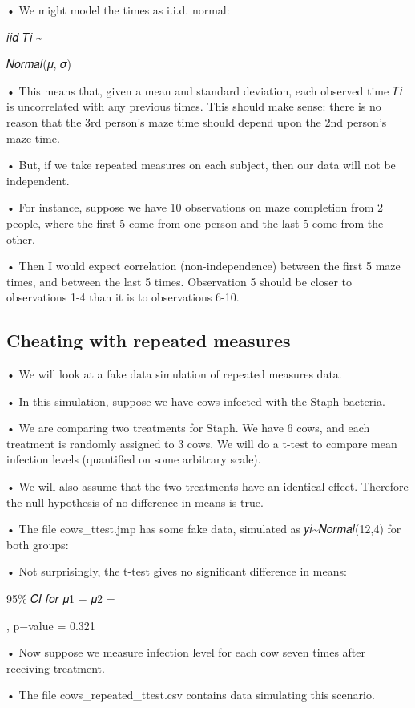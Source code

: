 \documentclass[
  letterpaper,
  DIV=11,
  numbers=noendperiod]{scrreprt}
\begin{document}
• We might model the times as i.i.d. normal:

𝑖𝑖𝑑 𝑇𝑖 \textasciitilde{}

𝑁𝑜𝑟𝑚𝑎𝑙(𝜇, 𝜎)

• This means that, given a mean and standard deviation, each observed
time 𝑇𝑖 is uncorrelated with any previous times. This should make sense:
there is no reason that the 3rd person's maze time should depend upon
the 2nd person's maze time.

• But, if we take repeated measures on each subject, then our data will
not be independent.

• For instance, suppose we have 10 observations on maze completion from
2 people, where the first 5 come from one person and the last 5 come
from the other.

• Then I would expect correlation (non-independence) between the first 5
maze times, and between the last 5 times. Observation 5 should be closer
to observations 1-4 than it is to observations 6-10.

\hypertarget{cheating-with-repeated-measures}{%
\subsection{Cheating with repeated
measures}\label{cheating-with-repeated-measures}}

• We will look at a fake data simulation of repeated measures data.

• In this simulation, suppose we have cows infected with the Staph
bacteria.

• We are comparing two treatments for Staph. We have 6 cows, and each
treatment is randomly assigned to 3 cows. We will do a t-test to compare
mean infection levels (quantified on some arbitrary scale).

• We will also assume that the two treatments have an identical effect.
Therefore the null hypothesis of no difference in means is true.

• The file cows\_ttest.jmp has some fake data, simulated as
𝑦𝑖\textasciitilde 𝑁𝑜𝑟𝑚𝑎𝑙(12,4) for both groups:

• Not surprisingly, the t-test gives no significant difference in means:

95\% 𝐶𝐼 𝑓𝑜𝑟 𝜇1 − 𝜇2 =

, p−value = 0.321

• Now suppose we measure infection level for each cow seven times after
receiving treatment.

• The file cows\_repeated\_ttest.csv contains data simulating this
scenario.
\end{document}
